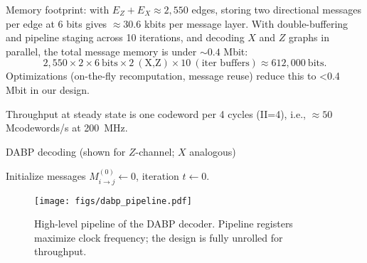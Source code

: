Memory footprint: with \(E_Z+E_X\approx 2{,}550\) edges, storing two directional messages per edge at 6 bits gives \(\approx 30.6\) kbits per message layer. With double-buffering and pipeline staging across 10 iterations, and decoding \(X\) and \(Z\) graphs in parallel, the total message memory is under \(\sim 0.4\) Mbit:
\[
2{,}550 \times 2 \times 6~\mathrm{bits} \times 2~(\text{X,Z}) \times 10~(\text{iter buffers}) \approx 612{,}000~\mathrm{bits}.
\]
Optimizations (on-the-fly recomputation, message reuse) reduce this to <0.4 Mbit in our design.

Throughput at steady state is one codeword per 4 cycles (II=4), i.e., \(\approx 50\) Mcodewords/s at \SI{200}{\mega\hertz}.

\begin{algorithm}[t]
\footnotesize
\DontPrintSemicolon
\caption{DABP decoding (shown for \(Z\)-channel; \(X\) analogous)}\label{algo:dabp}
Initialize messages \(M_{i\to j}^{(0)}\gets 0\), iteration \(t\gets0\).\;
\end{algorithm}

\begin{figure}[t!]
\centering
\texttt{[image: figs/dabp\_pipeline.pdf]}
\caption{High-level pipeline of the DABP decoder. Pipeline registers maximize clock frequency; the design is fully unrolled for throughput.}
\label{fig:fpga}
\end{figure}

